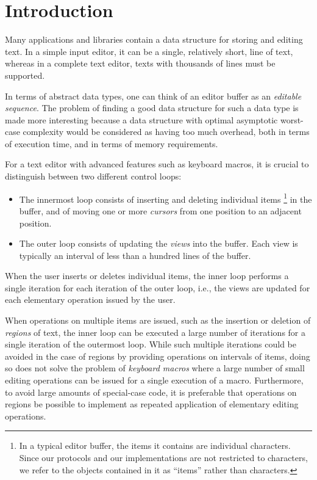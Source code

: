 \section{Introduction}
\label{sec-introduction}

Many applications and libraries contain a data structure for storing
and editing text.  In a simple input editor, it can be a single,
relatively short, line of text, whereas in a complete text editor,
texts with thousands of lines must be supported.

In terms of abstract data types, one can think of an editor buffer as
an \emph{editable sequence}.  The problem of finding a good data
structure for such a data type is made more interesting because a data
structure with optimal asymptotic worst-case complexity would be
considered as having too much overhead, both in terms of execution
time, and in terms of memory requirements.

For a text editor with advanced features such as keyboard macros, it
is crucial to distinguish between two different control loops:

\begin{itemize}
\item The innermost loop consists of inserting and deleting individual
  items%
\footnote{In a typical editor buffer, the items it contains are
  individual characters.  Since our protocols and our implementations
  are not restricted to characters, we refer to the objects contained
  in it as ``items'' rather than characters.}
in the buffer, and of moving one or
  more \emph{cursors} from one position to an adjacent position.
\item The outer loop consists of updating the \emph{views} into the
  buffer.  Each view is typically an interval of less than a
  hundred lines of the buffer.
\end{itemize}

When the user inserts or deletes individual items, the inner loop
performs a single iteration for each iteration of the outer loop,
i.e., the views are updated for each elementary operation issued by
the user.

When operations on multiple items are issued, such as the insertion or
deletion of \emph{regions} of text, the inner loop can be executed a
large number of iterations for a single iteration of the outermost
loop.  While such multiple iterations could be avoided in the case of
regions by providing operations on intervals of items, doing so does
not solve the problem of \emph{keyboard macros} where a large number
of small editing operations can be issued for a single execution of a
macro.  Furthermore, to avoid large amounts of special-case code, it
is preferable that operations on regions be possible to implement as
repeated application of elementary editing operations.

